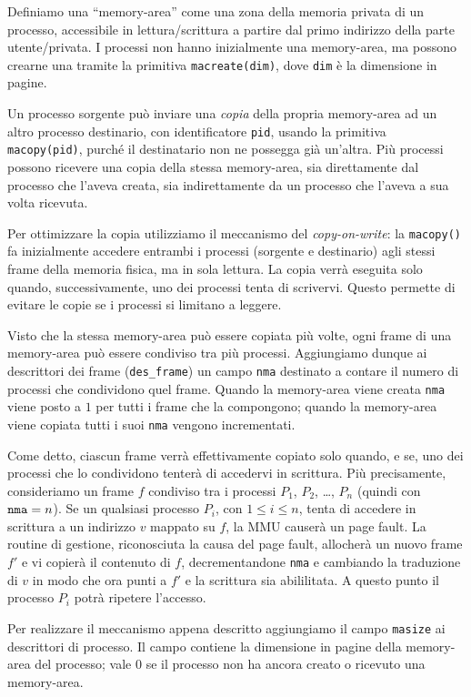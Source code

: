 Definiamo una ``memory-area'' come una zona della memoria privata di un processo,
accessibile in lettura/scrittura a partire dal primo indirizzo della parte utente/privata.
I processi non hanno inizialmente una memory-area, ma possono crearne una tramite
la primitiva \verb|macreate(dim)|, dove \verb|dim| \`e la dimensione in pagine.

Un processo sorgente pu\`o inviare una {\em copia} della propria memory-area ad un altro
processo destinario, con identificatore \verb|pid|, usando la primitiva \verb|macopy(pid)|,
purch\'e il destinatario non ne possegga gi\`a un'altra. 
Pi\`u processi possono ricevere una copia della stessa memory-area, sia direttamente dal
processo che l'aveva creata, sia indirettamente da un processo che l'aveva a sua volta
ricevuta.

Per ottimizzare la copia utilizziamo il meccanismo del {\em copy-on-write}:
la \verb|macopy()| fa inizialmente accedere entrambi i processi (sorgente e destinario)
agli stessi frame della memoria fisica, ma in sola lettura. La copia verr\`a eseguita solo quando,
successivamente, uno dei processi tenta di scrivervi. Questo permette di evitare le copie
se i processi si limitano a leggere.

Visto che la stessa memory-area pu\`o essere copiata pi\`u volte, ogni frame
di una memory-area pu\`o essere condiviso tra pi\`u processi. Aggiungiamo dunque ai descrittori
dei frame (\verb|des_frame|) un campo \verb|nma| destinato a contare il numero di processi che condividono
quel frame. Quando la memory-area viene creata \verb|nma| viene posto a $1$ per tutti
i frame che la compongono; quando la memory-area viene copiata
tutti i suoi \verb|nma| vengono incrementati.

Come detto, ciascun frame verr\`a effettivamente
copiato solo quando, e se, uno dei processi  che lo condividono tenter\`a di accedervi in scrittura.
Pi\`u precisamente, consideriamo un frame $f$ condiviso tra i processi $P_1$, $P_2$, \dots, $P_n$
(quindi con $\verb|nma| = n$). Se un qualsiasi processo $P_i$, con $1\le i \le n$, tenta di
accedere in scrittura a un indirizzo $v$ mappato su $f$, la MMU causer\`a un page fault.
La routine di gestione, riconosciuta la causa del page fault, allocher\`a un nuovo frame $f'$ e
vi copier\`a il contenuto di $f$, decrementandone \verb|nma| e cambiando la traduzione di $v$
in modo che ora punti a $f'$ e la scrittura sia abililitata. A questo punto il processo $P_i$
potr\`a ripetere l'accesso.

Per realizzare il meccanismo appena descritto aggiungiamo il campo \verb|masize| ai descrittori
di processo. Il campo contiene la dimensione in pagine della memory-area del processo; vale 0 se il processo
non ha ancora creato o ricevuto una memory-area.

